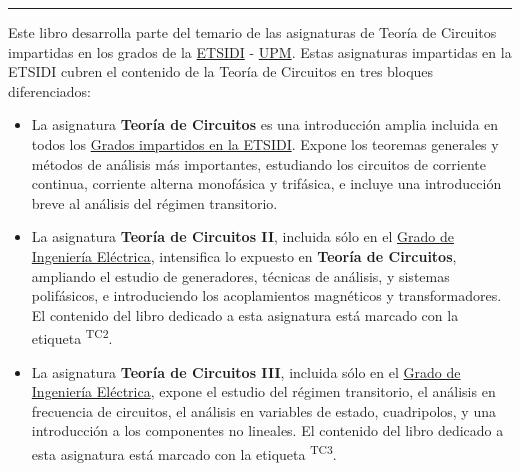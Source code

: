 \vspace*{\fill}

\rule[.5ex]{\linewidth}{1pt} 

Este libro desarrolla parte del temario de las asignaturas de Teoría de Circuitos impartidas en los grados de la \href{http://www.etsidi.upm.es/}{ETSIDI} - \href{http://www.upm.es/}{UPM}. Estas asignaturas impartidas en la ETSIDI cubren el contenido de la Teoría de Circuitos en tres bloques diferenciados:
\begin{itemize}
\item La asignatura \textbf{Teoría de Circuitos} es una introducción amplia incluida en todos los \href{http://www.etsidi.upm.es/Estudiantes/EstudiosTitulaciones/ETTitulosGrado/ETTitulosOficialesGrado}{Grados impartidos en la ETSIDI}. Expone los teoremas generales y métodos de análisis más importantes, estudiando los circuitos de corriente continua, corriente alterna monofásica y trifásica, e incluye una introducción breve al análisis del régimen transitorio.
\item La asignatura \textbf{Teoría de Circuitos II}, incluida sólo en el \href{http://www.etsidi.upm.es/Estudiantes/EstudiosTitulaciones/ETTitulosGrado/ETTitulosOficialesGrado/GradIngElectrica}{Grado de Ingeniería Eléctrica}, intensifica lo expuesto en \textbf{Teoría de Circuitos}, ampliando el estudio de generadores, técnicas de análisis, y sistemas polifásicos, e introduciendo los acoplamientos magnéticos y transformadores. El contenido del libro dedicado a esta asignatura está marcado con la etiqueta \textsuperscript{TC2}.
\item La asignatura \textbf{Teoría de Circuitos III}, incluida sólo en el \href{http://www.etsidi.upm.es/Estudiantes/EstudiosTitulaciones/ETTitulosGrado/ETTitulosOficialesGrado/GradIngElectrica}{Grado de Ingeniería Eléctrica}, expone el estudio del régimen transitorio, el análisis en frecuencia de circuitos, el análisis en variables de estado, cuadripolos, y una introducción a los componentes no lineales. El contenido del libro dedicado a esta asignatura está marcado con la etiqueta \textsuperscript{TC3}.
\end{itemize}

